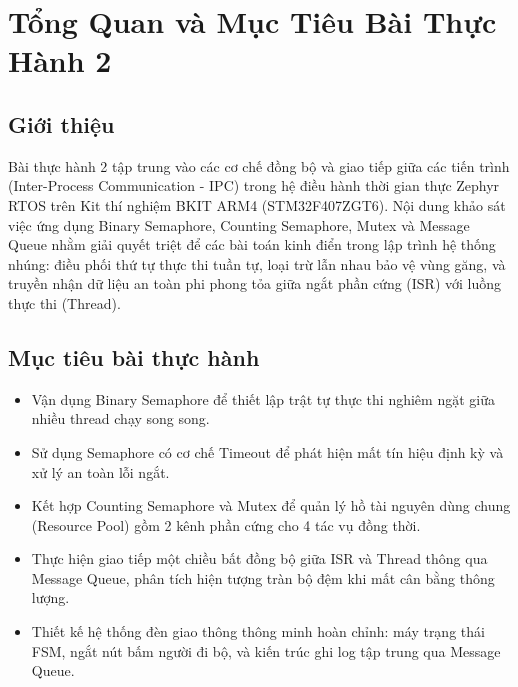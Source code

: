 \section{Tổng Quan và Mục Tiêu Bài Thực Hành 2}

\subsection{Giới thiệu}
Bài thực hành 2 tập trung vào các cơ chế đồng bộ và giao tiếp giữa các tiến trình (Inter-Process Communication - IPC) trong hệ điều hành thời gian thực Zephyr RTOS trên Kit thí nghiệm BKIT ARM4 (STM32F407ZGT6). Nội dung khảo sát việc ứng dụng Binary Semaphore, Counting Semaphore, Mutex và Message Queue nhằm giải quyết triệt để các bài toán kinh điển trong lập trình hệ thống nhúng: điều phối thứ tự thực thi tuần tự, loại trừ lẫn nhau bảo vệ vùng găng, và truyền nhận dữ liệu an toàn phi phong tỏa giữa ngắt phần cứng (ISR) với luồng thực thi (Thread).

\subsection{Mục tiêu bài thực hành}
\begin{itemize}
    \item Vận dụng Binary Semaphore để thiết lập trật tự thực thi nghiêm ngặt giữa nhiều thread chạy song song.
    \item Sử dụng Semaphore có cơ chế Timeout để phát hiện mất tín hiệu định kỳ và xử lý an toàn lỗi ngắt.
    \item Kết hợp Counting Semaphore và Mutex để quản lý hồ tài nguyên dùng chung (Resource Pool) gồm 2 kênh phần cứng cho 4 tác vụ đồng thời.
    \item Thực hiện giao tiếp một chiều bất đồng bộ giữa ISR và Thread thông qua Message Queue, phân tích hiện tượng tràn bộ đệm khi mất cân bằng thông lượng.
    \item Thiết kế hệ thống đèn giao thông thông minh hoàn chỉnh: máy trạng thái FSM, ngắt nút bấm người đi bộ, và kiến trúc ghi log tập trung qua Message Queue.
\end{itemize}

